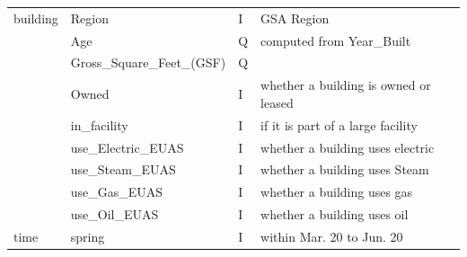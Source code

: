 \documentclass[12pt]{article}
\begin{document}
{\begin{longtable}{lllp{4cm}p{4cm}}
              \hline
building      & Region                     & I    & GSA Region                                                                                                                               &                                                                         \\
              & Age                        & Q    & computed from Year\_Built                                                                                                                &                                                                         \\
              & Gross\_Square\_Feet\_(GSF) & Q    &                                                                                                                                          &                                                                         \\
              & Owned                      & I    &  whether a building is owned or leased                                                                                       &                                                                         \\
              & in\_facility               & I    &  if it is part of a large facility                                                                                           &                                                                         \\
              & use\_Electric\_EUAS        & I    &  whether a building uses electric                                                            &                                                                         \\
              & use\_Steam\_EUAS           & I    &  whether a building uses Steam&                                                                         \\
              & use\_Gas\_EUAS             & I    &  whether a building uses gas&                                                                         \\
              & use\_Oil\_EUAS             & I    &  whether a building uses oil&                                                                         \\
              \hline
time          & spring                     & I    & within Mar. 20 to Jun. 20                                                                                                                &                                                                         \\

\end{longtable}}
\end{document}
